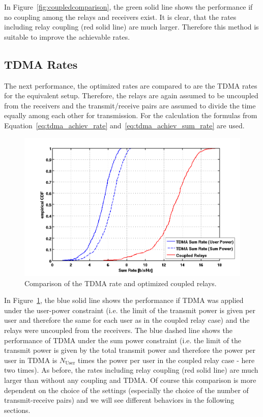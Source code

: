 In Figure~\ref{fig:coupledcomparison}, the green solid line shows the performance if no coupling among the relays and receivers exist.
It is clear, that the rates including relay coupling (red solid line) are much larger.
Therefore this method is suitable to improve the achievable rates.


\subsection{TDMA Rates}
The next performance, the optimized rates are compared to are the TDMA rates for the equivalent setup.
Therefore, the relays are again assumed to be uncoupled from the receivers and the transmit/receive pairs are assumed to divide the time equally among each other for transmission.
For the calculation the formulas from Equation~\eqref{eq:tdma_achiev_rate} and~\eqref{eq:tdma_achiev_sum_rate} are used.

\begin{figure}[h]
\centering
  \includegraphics[width=0.7\linewidth]{images/TDMAcomparison.png}
\caption{Comparison of the TDMA rate and optimized coupled relays.}
\label{fig:TDMAcomparison}
\end{figure}

In Figure~\ref{fig:TDMAcomparison}, the blue solid line shows the performance if TDMA was applied under the user-power constraint (i.e. the limit of the transmit power is given per user and therefore the same for each user as in the coupled relay case) and the relays were uncoupled from the receivers.
The blue dashed line shows the performance of TDMA under the sum power constraint (i.e. the limit of the transmit power is given by the total transmit power and therefore the power per user in TDMA is $N_\text{User}$ times the power per user in the coupled relay case - here two times).
As before, the rates including relay coupling (red solid line) are much larger than without any coupling and TDMA.
Of course this comparison is more dependent on the choice of the settings (especially the choice of the number of transmit-receive pairs) and we will see different behaviors in the following sections. 

